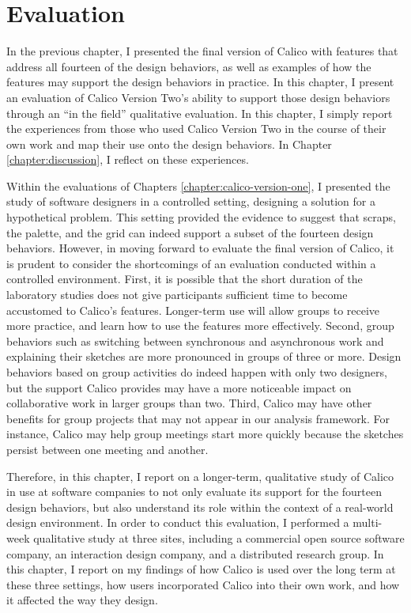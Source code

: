 \chapter{Evaluation}
\label{chapter:evaluation}

In the previous chapter, I presented the final version of Calico with features that address all fourteen of the design behaviors, as well as examples of how the features may support the design behaviors in practice. In this chapter, I present an evaluation of Calico Version Two's ability to support those design behaviors through an ``in the field'' qualitative evaluation. In this chapter, I simply report the experiences from those who used Calico Version Two in the course of their own work and map their use onto the design behaviors. In Chapter \ref{chapter:discussion}, I reflect on these experiences.

Within the evaluations of Chapters \ref{chapter:calico-version-one}, I presented the study of software designers in a controlled setting, designing a solution for a hypothetical problem. This setting provided the evidence to suggest that scraps, the palette, and the grid can indeed support a subset of the fourteen design behaviors. However, in moving forward to evaluate the final version of Calico, it is prudent to consider the shortcomings of an evaluation conducted within a controlled environment. First, it is possible that the short duration of the laboratory studies does not give participants sufficient time to become accustomed to Calico's features. Longer-term use will allow groups to receive more practice, and learn how to use the features more effectively. Second, group behaviors such as switching between synchronous and asynchronous work and explaining their sketches are more pronounced in groups of three or more. Design behaviors based on group activities do indeed happen with only two designers, but the support Calico provides may have a more noticeable impact on collaborative work in larger groups than two. Third, Calico may have other benefits for group projects that may not appear in our analysis framework. For instance, Calico may help group meetings start more quickly because the sketches persist between one meeting and another.

Therefore, in this chapter, I report on a longer-term, qualitative study of Calico in use at software companies to not only evaluate its support for the fourteen design behaviors, but also understand its role within the context of a real-world design environment. In order to conduct this evaluation, I performed a multi-week qualitative study at three sites, including a commercial open source software company, an interaction design company, and a distributed research group. In this chapter, I report on my findings of how Calico is used over the long term at these three settings, how users incorporated Calico into their own work, and how it affected the way they design.

